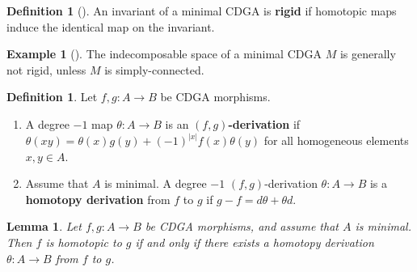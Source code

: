 \documentclass[11pt]{amsart}
\newtheorem{lemma}[theorem]{Lemma}
\theoremstyle{definition}
\newtheorem{definition}[theorem]{Definition}
\newtheorem{example}[theorem]{Example}
\numberwithin{equation}{section}
\numberwithin{equation}{section}
\begin{document}
\begin{definition}[\cite{Morgan-corrections}]
An invariant of a minimal CDGA is \textbf{rigid} if homotopic maps induce the identical map on the invariant. 
\end{definition}

\begin{example}[\cite{Morgan-corrections}]\label{Example: rigid invariants}
The indecomposable space of a minimal CDGA $M$ is generally not rigid, unless $M$ is simply-connected. 
\end{example}


\begin{definition}
Let $f,g:A\rightarrow B$ be CDGA morphisms.
\begin{enumerate}[leftmargin=0.25in]
    \item A degree $-1$ map $\theta:A\rightarrow B$ is an \textbf{$(f,g)$-derivation} if $\theta(xy)=\theta(x)g(y)+(-1)^{|x|}f(x)\theta(y)$ for all homogeneous elements $x,y\in A$.
    \item Assume that $A$ is minimal. A degree $-1$ $(f,g)$-derivation $\theta:A\rightarrow B$ is a \textbf{homotopy derivation} from $f$ to $g$ if $g-f =d\theta+\theta d$.
\end{enumerate}
\end{definition}


\begin{lemma}\label{Lem: equivalence of two homotopies for maps between minimal CDGA's}
Let $f,g:A\rightarrow B$ be CDGA morphisms, and assume that $A$ is minimal. Then $f$ is homotopic to $g$ if and only if there exists a homotopy derivation $\theta:A\rightarrow B$ from $f$ to $g$.
\end{lemma}
\end{document}
